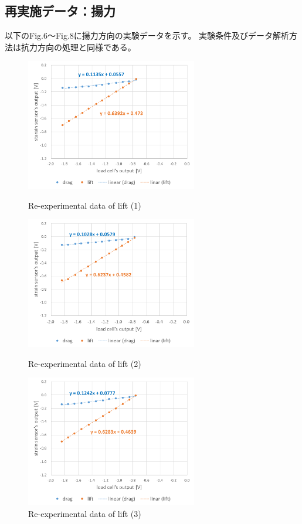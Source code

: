 \documentclass[twocolumn,a4j]{jsarticle}
\begin{document}
\subsection{再実施データ：揚力}
以下のFig.6～Fig.8に揚力方向の実験データを示す。
実験条件及びデータ解析方法は抗力方向の処理と同様である。
\begin{figure}[htbp]
    \footnotesize
    \begin{center}
        \includegraphics[width=75mm]{../images/graph_21119_lift_1.png}
        \caption{Re-experimental data of lift (1)}
        \includegraphics[width=75mm]{../images/graph_21119_lift_2.png}
        \caption{Re-experimental data of lift (2)}
        \includegraphics[width=75mm]{../images/graph_21119_lift_3.png}
        \caption{Re-experimental data of lift (3)}
    \end{center}
\end{figure}
\end{document}
